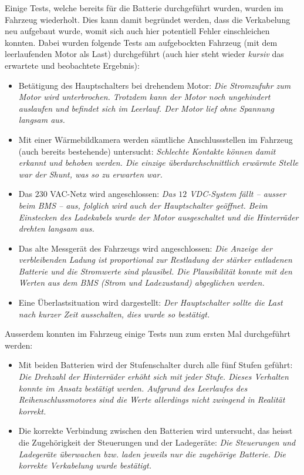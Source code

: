 \color{blue} Einige Tests, welche bereits für die Batterie durchgeführt wurden, wurden im Fahrzeug wiederholt. Dies kann damit begründet werden, dass die Verkabelung neu aufgebaut wurde, womit sich auch hier potentiell Fehler einschleichen konnten. Dabei wurden folgende Tests am aufgebockten Fahrzeug (mit dem leerlaufenden Motor als Last) durchgeführt (auch hier steht wieder \textit{kursiv} das erwartete und beobachtete Ergebnis): \begin{itemize}
	\item Betätigung des Hauptschalters bei drehendem Motor: \textit{Die Stromzufuhr zum Motor wird unterbrochen. Trotzdem kann der Motor noch ungehindert auslaufen und befindet sich im Leerlauf. Der Motor lief ohne Spannung langsam aus.}
	\item Mit einer Wärmebildkamera werden sämtliche Anschlussstellen im Fahrzeug (auch bereits bestehende) untersucht: \textit{Schlechte Kontakte können damit erkannt und behoben werden. Die einzige überdurchschnittlich erwärmte Stelle war der Shunt, was so zu erwarten war.}
	\item Das $230$ VAC-Netz wird angeschlossen: \textit{Das $12$ VDC-System fällt -- ausser beim BMS -- aus, folglich wird auch der Hauptschalter geöffnet. Beim Einstecken des Ladekabels wurde der Motor ausgeschaltet und die Hinterräder drehten langsam aus.}
	\item Das alte Messgerät des Fahrzeugs wird angeschlossen: \textit{Die Anzeige der verbleibenden Ladung ist proportional zur Restladung der stärker entladenen Batterie und die Stromwerte sind plausibel. Die Plausibilität konnte mit den Werten aus dem BMS (Strom und Ladezustand) abgeglichen werden.}
	\item Eine Überlastsituation wird dargestellt: \textit{Der Hauptschalter sollte die Last nach kurzer Zeit ausschalten, dies wurde so bestätigt.}
\end{itemize}

Ausserdem konnten im Fahrzeug einige Tests nun zum ersten Mal durchgeführt werden: \begin{itemize}
	\item Mit beiden Batterien wird der Stufenschalter durch alle fünf Stufen geführt: \textit{Die Drehzahl der Hinterräder erhöht sich mit jeder Stufe. Dieses Verhalten konnte im Ansatz bestätigt werden. Aufgrund des Leerlaufes des Reihenschlussmotores sind die Werte allerdings nicht zwingend in Realität korrekt.}
	\item Die korrekte Verbindung zwischen den Batterien wird untersucht, das heisst die Zugehörigkeit der Steuerungen und der Ladegeräte: \textit{Die Steuerungen und Ladegeräte überwachen bzw. laden jeweils nur die zugehörige Batterie. Die korrekte Verkabelung wurde bestätigt.}
\end{itemize}

